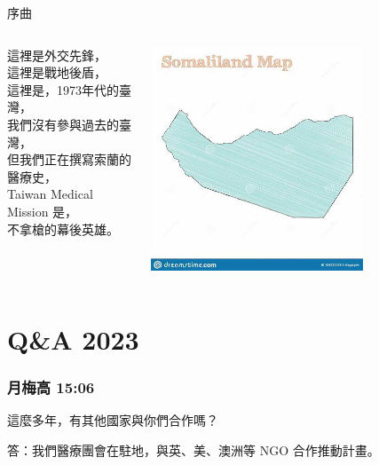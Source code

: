 \documentclass[aspectratio=169]{beamer}
\begin{document}
\begin{frame}{序曲}

\begin{columns}
    \begin{outline}
        這裡是外交先鋒，\\
        這裡是戰地後盾，\\
        這裡是，1973年代的臺灣，\\
        我們沒有參與過去的臺灣，\\
        但我們正在撰寫索蘭的醫療史，\\
        Taiwan Medical Mission 是，\\
        不拿槍的幕後英雄。\\
    \end{outline}

\includegraphics[width=0.7\textwidth]{Somaliland.jpeg}
\end{columns}

\end{frame}




\section{Q\&A 2023}


\begin{frame}
\frametitle{月梅高 15:06}
這麼多年，有其他國家與你們合作嗎？

答：我們醫療團會在駐地，與英、美、澳洲等 NGO 合作推動計畫。
\end{frame}
\end{document}
